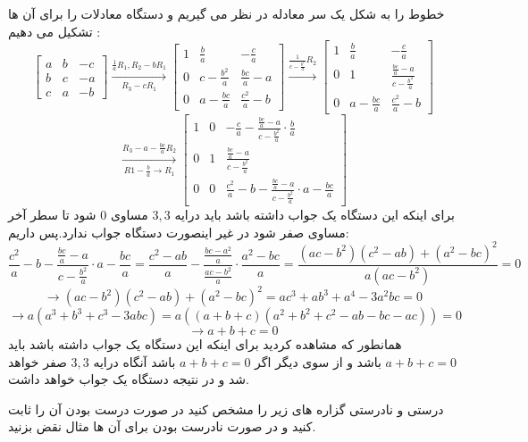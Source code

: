 \documentclass{article}
\begin{document}
\begin{حل}
	خطوط را به شکل یک سر معادله در نظر می گیریم و دستگاه معادلات را برای آن ها تشکیل می دهیم :
	$$
\begin{bmatrix}
	a&b&-c\\
	b&c&-a\\
	c&a&-b
\end{bmatrix}\xrightarrow[R_3-cR_1]{\frac{1}{a}R_1,R_2-bR_1}
\begin{bmatrix}
1&\frac{b}{a}&-\frac{c}{a}\\
0&c-\frac{b^2}{a}&\frac{bc}{a}-a\\
0&a-\frac{bc}{a}&\frac{c^2}{a}-b
\end{bmatrix}\xrightarrow{\frac{1}{c-\frac{b^2}{a}}R_2}
\begin{bmatrix}
1&\frac{b}{a}&-\frac{c}{a}\\
0&1&\frac{\frac{bc}{a}-a}{c-\frac{b^2}{a}}\\
0&a-\frac{bc}{a}&\frac{c^2}{a}-b
\end{bmatrix}
$$
$$\xrightarrow[R1-\frac{b}{a}\to R_1]{R_3-a-\frac{bc}{a}R_2}
\begin{bmatrix}
1&0&-\frac{c}{a}-\frac{\frac{bc}{a}-a}{c-\frac{b^2}{a}}\cdot\frac{b}{a}\\
0&1&\frac{\frac{bc}{a}-a}{c-\frac{b^2}{a}}\\
0&0&\frac{c^2}{a}-b-\frac{\frac{bc}{a}-a}{c-\frac{b^2}{a}}\cdot a-\frac{bc}{a}
\end{bmatrix}
$$
برای اینکه این دستگاه یک جواب داشته باشد باید درایه 
$3,3$
مساوی 
$0$
شود تا سطر آخر مساوی صفر شود در غیر اینصورت دستگاه جواب ندارد.پس داریم:
$$\frac{c^2}{a}-b-\frac{\frac{bc}{a}-a}{c-\frac{b^2}{a}}\cdot a-\frac{bc}{a}=\frac{c^2-ab}{a}-\frac{\frac{bc-a^2}{a}}{\frac{ac-b^2}{a}}\cdot \frac{a^2-bc}{a}=\frac{(ac-b^2)(c^2-ab)+(a^2-bc)^2}{a(ac-b^2)}=0$$
$$\longrightarrow (ac-b^2)(c^2-ab)+(a^2-bc)^2=ac^3+ab^3+a^4-3a^2bc=0 $$
$$\longrightarrow a(a^3+b^3+c^3-3abc)=a((a+b+c)(a^2+b^2+c^2-ab-bc-ac))=0$$
$$\longrightarrow a+b+c=0$$
همانطور که مشاهده کردید برای اینکه این دستگاه یک جواب داشته باشد باید 
$a+b+c=0$
باشد و از سوی دیگر اگر 
$a+b+c=0$
باشد آنگاه درایه 
$3,3$
صفر خواهد شد و در نتیجه دستگاه یک جواب خواهد داشت.
\end{حل}
درستی و نادرستی گزاره های زیر را مشخص کنید در صورت درست بودن آن را ثابت کنید و در صورت نادرست بودن برای آن ها مثال نقض بزنید.
\end{document}
